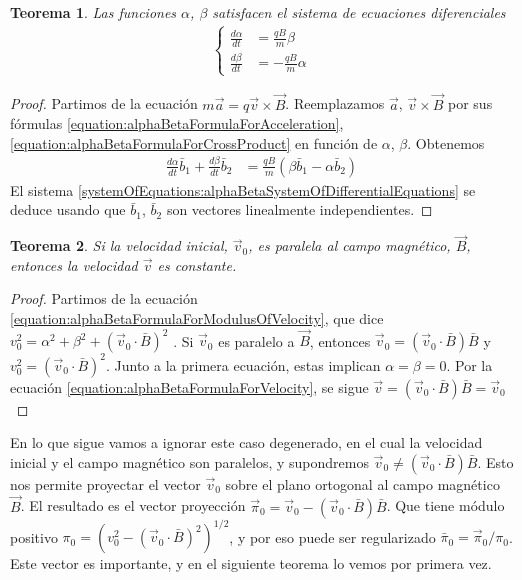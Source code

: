 \documentclass{article}
\newtheorem{theorem}{Teorema}
\begin{document}
  \begin{theorem}
    Las funciones \(\alpha\), \(\beta\) satisfacen el sistema de ecuaciones diferenciales
    \begin{align}
      \label{systemOfEquations:alphaBetaSystemOfDifferentialEquations}
      \left\{
        \begin{aligned}
          \frac{d \alpha}{d t} &= \frac{q B}{m} \beta
          \\
          \frac{d \beta}{d t} &= - \frac{q B}{m} \alpha
        \end{aligned}
      \right.
    \end{align}
  \end{theorem}
  \begin{proof}
    Partimos de la ecuación \(m \vec{a} = q \vec{v} \times \vec{B}\).
    Reemplazamos \(\vec{a}\), \(\vec{v} \times \vec{B}\) por sus fórmulas \eqref{equation:alphaBetaFormulaForAcceleration}, \eqref{equation:alphaBetaFormulaForCrossProduct} en función de \(\alpha\), \(\beta\).
    Obtenemos
    \begin{align}
      \frac{d \alpha}{d t} \bar{b}_1 + \frac{d \beta}{d t} \bar{b}_2
      &=
      \frac{q B}{m} (\beta \bar{b}_1 - \alpha \bar{b}_2)
    \end{align}
    El sistema \eqref{systemOfEquations:alphaBetaSystemOfDifferentialEquations} se deduce usando que \(\bar{b}_1\), \(\bar{b}_2\) son vectores linealmente independientes.
  \end{proof}

  \begin{theorem}
    Si la velocidad inicial, \(\vec{v}_0\), es paralela al campo magnético, \(\vec{B}\), entonces la velocidad \(\vec{v}\) es constante.
  \end{theorem}
  \begin{proof}
    Partimos de la ecuación \eqref{equation:alphaBetaFormulaForModulusOfVelocity}, que dice \(
      v_0^2
      =
      \alpha^2 + \beta^2
      + (\vec{v}_0 \cdot \bar{B})^2
    \)
    .
    Si \(\vec{v}_0\) es paralelo a \(\vec{B}\), entonces \(\vec{v}_0 = (\vec{v}_0 \cdot \bar{B}) \bar{B}\) y \(v_0^2 = (\vec{v}_0 \cdot \bar{B})^2\).
    Junto a la primera ecuación, estas implican \(\alpha = \beta = 0\).
    Por la ecuación \eqref{equation:alphaBetaFormulaForVelocity}, se sigue \(\vec{v} = (\vec{v}_0 \cdot \bar{B}) \bar{B} = \vec{v}_0\)
  \end{proof}

  En lo que sigue vamos a ignorar este caso degenerado, en el cual la velocidad inicial y el campo magnético son paralelos, y supondremos \(\vec{v}_0 \neq (\vec{v}_0 \cdot \bar{B}) \bar{B}\).
  Esto nos permite proyectar el vector \(\vec{v}_0\) sobre el plano ortogonal al campo magnético \(\vec{B}\).
  El resultado es el vector proyección \(\vec{\pi}_0 = \vec{v}_0 - (\vec{v}_0 \cdot \bar{B}) \bar{B}\).
  Que tiene módulo positivo \(\pi_0 = (v_0^2 - (\vec{v}_0 \cdot \bar{B})^2)^{1 / 2}\), y por eso puede ser regularizado \(\bar{\pi}_0 = \vec{\pi}_0 / \pi_0\).
  Este vector es importante, y en el siguiente teorema lo vemos por primera vez.
\end{document}
